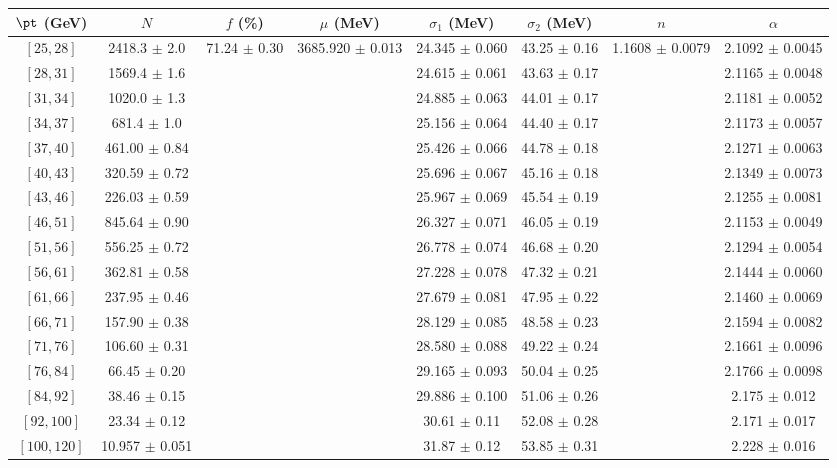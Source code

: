 \begin{tabular}{c||c|c|c|c|c|c|c}
$\pt$ (GeV) & $N$ & $f$ (\%) & $\mu$ (MeV) & $\sigma_1$ (MeV) & $\sigma_2$ (MeV) & $n$ & $\alpha$ \\
\hline
$[25, 28]$ & 2418.3 $\pm$ 2.0 & \multirow{17}{*}{71.24 $\pm$ 0.30} & \multirow{17}{*}{3685.920 $\pm$ 0.013} & 24.345 $\pm$ 0.060 & 43.25 $\pm$ 0.16 & \multirow{17}{*}{1.1608 $\pm$ 0.0079} & 2.1092 $\pm$ 0.0045\\
$[28, 31]$ & 1569.4 $\pm$ 1.6 &  &  & 24.615 $\pm$ 0.061 & 43.63 $\pm$ 0.17 &  & 2.1165 $\pm$ 0.0048\\
$[31, 34]$ & 1020.0 $\pm$ 1.3 &  &  & 24.885 $\pm$ 0.063 & 44.01 $\pm$ 0.17 &  & 2.1181 $\pm$ 0.0052\\
$[34, 37]$ & 681.4 $\pm$ 1.0 &  &  & 25.156 $\pm$ 0.064 & 44.40 $\pm$ 0.17 &  & 2.1173 $\pm$ 0.0057\\
$[37, 40]$ & 461.00 $\pm$ 0.84 &  &  & 25.426 $\pm$ 0.066 & 44.78 $\pm$ 0.18 &  & 2.1271 $\pm$ 0.0063\\
$[40, 43]$ & 320.59 $\pm$ 0.72 &  &  & 25.696 $\pm$ 0.067 & 45.16 $\pm$ 0.18 &  & 2.1349 $\pm$ 0.0073\\
$[43, 46]$ & 226.03 $\pm$ 0.59 &  &  & 25.967 $\pm$ 0.069 & 45.54 $\pm$ 0.19 &  & 2.1255 $\pm$ 0.0081\\
$[46, 51]$ & 845.64 $\pm$ 0.90 &  &  & 26.327 $\pm$ 0.071 & 46.05 $\pm$ 0.19 &  & 2.1153 $\pm$ 0.0049\\
$[51, 56]$ & 556.25 $\pm$ 0.72 &  &  & 26.778 $\pm$ 0.074 & 46.68 $\pm$ 0.20 &  & 2.1294 $\pm$ 0.0054\\
$[56, 61]$ & 362.81 $\pm$ 0.58 &  &  & 27.228 $\pm$ 0.078 & 47.32 $\pm$ 0.21 &  & 2.1444 $\pm$ 0.0060\\
$[61, 66]$ & 237.95 $\pm$ 0.46 &  &  & 27.679 $\pm$ 0.081 & 47.95 $\pm$ 0.22 &  & 2.1460 $\pm$ 0.0069\\
$[66, 71]$ & 157.90 $\pm$ 0.38 &  &  & 28.129 $\pm$ 0.085 & 48.58 $\pm$ 0.23 &  & 2.1594 $\pm$ 0.0082\\
$[71, 76]$ & 106.60 $\pm$ 0.31 &  &  & 28.580 $\pm$ 0.088 & 49.22 $\pm$ 0.24 &  & 2.1661 $\pm$ 0.0096\\
$[76, 84]$ & 66.45 $\pm$ 0.20 &  &  & 29.165 $\pm$ 0.093 & 50.04 $\pm$ 0.25 &  & 2.1766 $\pm$ 0.0098\\
$[84, 92]$ & 38.46 $\pm$ 0.15 &  &  & 29.886 $\pm$ 0.100 & 51.06 $\pm$ 0.26 &  & 2.175 $\pm$ 0.012\\
$[92, 100]$ & 23.34 $\pm$ 0.12 &  &  & 30.61 $\pm$ 0.11 & 52.08 $\pm$ 0.28 &  & 2.171 $\pm$ 0.017\\
$[100, 120]$ & 10.957 $\pm$ 0.051 &  &  & 31.87 $\pm$ 0.12 & 53.85 $\pm$ 0.31 &  & 2.228 $\pm$ 0.016\\
\end{tabular}
